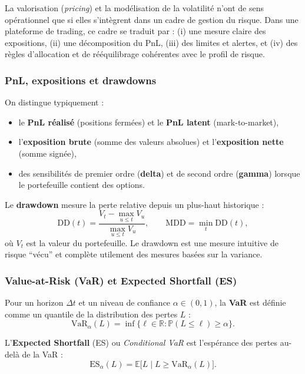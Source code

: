 \documentclass[11pt,a4paper]{article}
\newcommand{\1}{\mathbf{1}}
\begin{document}
La valorisation (\emph{pricing}) et la mod\'elisation de la volatilit\'e n'ont de sens op\'erationnel que si elles
s'int\`egrent dans un cadre de gestion du risque. Dans une plateforme de trading, ce cadre se traduit par :
(i) une mesure claire des expositions, (ii) une d\'ecomposition du PnL, (iii) des limites et alertes, et
(iv) des r\`egles d'allocation et de r\'e\'equilibrage coh\'erentes avec le profil de risque.

\subsubsection{PnL, expositions et drawdowns}

On distingue typiquement :
\begin{itemize}
  \item le \textbf{PnL r\'ealis\'e} (positions ferm\'ees) et le \textbf{PnL latent} (mark-to-market),
  \item l'\textbf{exposition brute} (somme des valeurs absolues) et l'\textbf{exposition nette} (somme sign\'ee),
  \item des sensibilit\'es de premier ordre (\textbf{delta}) et de second ordre (\textbf{gamma}) lorsque le portefeuille
        contient des options.
\end{itemize}

Le \textbf{drawdown} mesure la perte relative depuis un plus-haut historique :
\[
\mathrm{DD}(t)=\frac{V_t-\max_{u\le t}V_u}{\max_{u\le t}V_u},
\qquad
\mathrm{MDD}=\min_t \mathrm{DD}(t),
\]
où $V_t$ est la valeur du portefeuille. Le drawdown est une mesure intuitive de risque ``v\'ecu'' et compl\`ete utilement
des mesures bas\'ees sur la variance.

\subsubsection{Value-at-Risk (VaR) et Expected Shortfall (ES)}

Pour un horizon $\Delta t$ et un niveau de confiance $\alpha\in(0,1)$, la \textbf{VaR} est d\'efinie comme un quantile
de la distribution des pertes $L$ :
\[
\mathrm{VaR}_\alpha(L)=\inf\{\ell\in\mathbb{R}:\mathbb{P}(L\le \ell)\ge \alpha\}.
\]

L'\textbf{Expected Shortfall} (ES) ou \emph{Conditional VaR} est l'esp\'erance des pertes au-del\`a de la VaR :
\[
\mathrm{ES}_\alpha(L)=\mathbb{E}\big[L\mid L\ge \mathrm{VaR}_\alpha(L)\big].
\]
\end{document}
